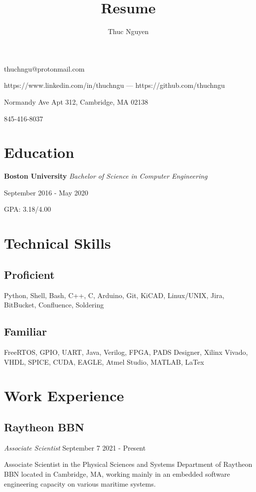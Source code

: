 \documentclass{article}
\makeatletter
\renewcommand{\maketitle}
{\begin{center}
{\huge\bfseries\theauthor}
\vspace{.5em}

thuchngu@protonmail.com

https://www.linkedin.com/in/thuchngu --- https://github.com/thuchngu

\end{center}}
\makeatother
\begin{document}
\title{Resume}
\author{Thuc Nguyen}
\maketitle
\vspace{-.5em}
{ Normandy Ave Apt 312, Cambridge, MA 02138

845-416-8037

}
\vspace{-1.5em}
\section{Education}
\textbf{Boston University}  \textit{Bachelor of Science in Computer Engineering}

September 2016 - May 2020

GPA: 3.18/4.00

\vspace{-.75em}
\section{Technical Skills}
\subsection{Proficient}
Python, Shell, Bash, C++, C, Arduino, Git, KiCAD, Linux/UNIX, Jira, BitBucket, Confluence, Soldering
\vspace{-.75em}
\subsection{Familiar}
FreeRTOS, GPIO, UART, Java, Verilog, FPGA, PADS Designer, Xilinx Vivado, VHDL, SPICE, CUDA, EAGLE, Atmel Studio, MATLAB, LaTex

\vspace{-.75em}
\section{Work Experience}
\subsection{Raytheon BBN} \textit{Associate Scientist}
  September 7 2021 - Present

Associate Scientist in the Physical Sciences and Systems Department of Raytheon BBN located in Cambridge, MA, working mainly in an embedded software engineering capacity on various maritime systems.
\vspace{-.75em}
\end{document}

